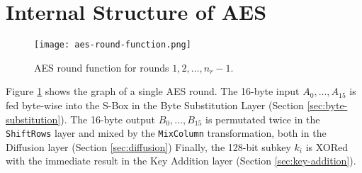 \section{Internal Structure of AES}

\begin{figure}[h] %
    \centering
    \texttt{[image: aes-round-function.png]} %
    \caption{
        AES round function for rounds $1, 2, \dots, n_r-1$.
    }
    \label{fig:aes-round-function} %
\end{figure}

Figure \ref{fig:aes-round-function} shows the graph of a single AES round. 
The 16-byte input $A_0, \dots, A_{15}$ is fed byte-wise into the S-Box in the Byte Substitution Layer (Section \ref{sec:byte-substitution}).
The 16-byte output $B_0, \dots, B_{15}$ is permutated twice in the \texttt{ShiftRows} layer and mixed by the \texttt{MixColumn} transformation, both in the Diffusion layer (Section \ref{sec:diffusion})
Finally, the 128-bit subkey $k_i$ is XORed with the immediate result in the Key Addition layer (Section \ref{sec:key-addition}).


% 



